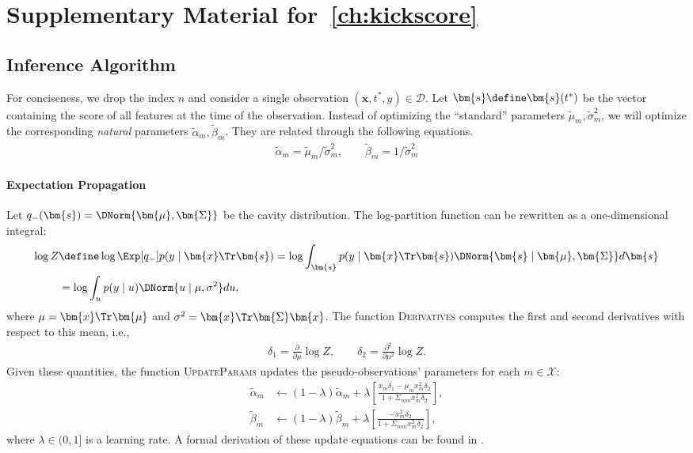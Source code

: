 \section{Supplementary Material for~\ref{ch:kickscore}}
\label{kks:app:suppmat}

\subsection{Inference Algorithm}
\label{kks:app:inference}

For conciseness, we drop the index $n$ and consider a single observation $(\bm{x}, t^*, y) \in \mathcal{D}$.
Let $\bm{s} \define \bm{s}(t^*)$ be the vector containing the score of all features at the time of the observation.
Instead of optimizing the ``standard'' parameters $\tilde{\mu}_m, \tilde{\sigma}^2_m$, we will optimize the corresponding \emph{natural} parameters $\tilde{\alpha}_m, \tilde{\beta}_m$.
They are related through the following equations.
\begin{align*}
	\tilde{\alpha}_m = \tilde{\mu}_m / \tilde{\sigma}^2_m, \qquad
	\tilde{\beta}_m = 1 / \tilde{\sigma}^2_m
\end{align*}

\paragraph{Expectation Propagation}

Let $q_{-}(\bm{s}) = \DNorm{\bm{\mu}, \bm{\Sigma}}$ be the cavity distribution.
The log-partition function can be rewritten as a one-dimensional integral:
\begin{align*}
	\log Z
	 & \define \log \Exp[q_{-}]{ p(y \mid \bm{x}\Tr \bm{s}) }
	= \log \int_{\bm{s}} p(y \mid \bm{x}\Tr \bm{s}) \DNorm{\bm{s} \mid \bm{\mu}, \bm{\Sigma}} d\bm{s} \\
	 & = \log \int_{u} p(y \mid u) \DNorm{u \mid \mu, \sigma^2} du,
\end{align*}
where $\mu = \bm{x}\Tr \bm{\mu}$ and $\sigma^2 = \bm{x}\Tr \bm{\Sigma} \bm{x}$.
The function \textsc{Derivatives} computes the first and second derivatives with respect to this mean, i.e.,
\begin{align*}
	\delta_1 = \frac{\partial}{\partial \mu} \log Z, \qquad
	\delta_2 = \frac{\partial^2}{\partial \mu^2} \log Z.
\end{align*}
Given these quantities, the function \textsc{UpdateParams} updates the pseudo-observations' parameters for each $m \in \mathcal{X}$:
\begin{align*}
	\tilde{\alpha}_m & \gets (1 - \lambda) \tilde{\alpha}_m
	+ \lambda \left[ \frac{x_m \delta_1 - \mu_m x_m^2 \delta_2}{1 + \Sigma_{mm} x_m^2 \delta_2} \right], \\
	\tilde{\beta}_m  & \gets (1 - \lambda) \tilde{\beta}_m
	+ \lambda \left[ \frac{-x_m^2 \delta_2}{1 + \Sigma_{mm} x_m^2 \delta_2} \right],
\end{align*}
where $\lambda \in (0, 1]$ is a learning rate.
A formal derivation of these update equations can be found in \citet{seeger2007bayesian, rasmussen2006gaussian, minka2001family}.

